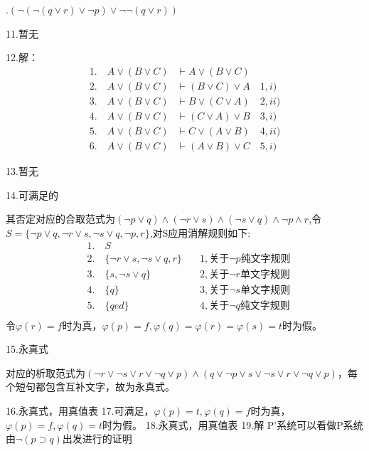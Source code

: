 \documentclass[a4paper]{ctexart}
\begin{document}
.$ \left( \neg \left( \neg \left( q\vee r\right)\vee \neg p \right)\vee \neg \neg \left( q\vee r\right) \right)$\newline

\noindent 11.暂无

\noindent 12.解：
\begin{align*}
    1.\quad A\vee (B\vee C)&\vdash A\vee (B\vee C) \\
    2.\quad A\vee (B\vee C)&\vdash (B\vee C)\vee A\quad 1, i) \\
    3.\quad A\vee (B\vee C)&\vdash B\vee (C\vee A)\quad 2, ii) \\
    4.\quad A\vee (B\vee C)&\vdash (C\vee A) \vee B\quad 3, i) \\
    5.\quad A\vee (B\vee C)&\vdash C\vee (A \vee B)\quad 4, ii) \\
    6.\quad A\vee (B\vee C)&\vdash (A\vee B) \vee C\quad 5, i)
\end{align*}

\noindent 13.暂无

\noindent 14.可满足的

其否定对应的合取范式为$(\neg p\vee q)\wedge(\neg r\vee s)\wedge(\neg s\vee q)\wedge \neg p \wedge r$,令$S=\{\neg p\vee q,\neg r\vee s,\neg s\vee q,\neg p,r\}$,对S应用消解规则如下:
\begin{align*}
    &1.\quad S &\\
    &2.\quad \{\neg r\vee s, \neg s\vee q, r\} \quad &1,\text{关于}\neg p\text{纯文字规则} \\
    &3.\quad \{s, \neg s\vee q\} \quad &2,\text{关于}\neg r\text{单文字规则}\\
    &4.\quad \{q\} \quad &3,\text{关于}\neg s\text{单文字规则}\\
    &5.\quad \{qed\} \quad &4,\text{关于}\neg q\text{纯文字规则}\\
\end{align*}
令$\varphi(r)=f$时为真，$\varphi(p)=f,\varphi(q)=\varphi(r)=\varphi(s)=t$时为假。\newline

\noindent 15.永真式

对应的析取范式为$(\neg r\vee \neg s\vee r\vee \neg q\vee p)\wedge (q\vee \neg p\vee s\vee \neg s\vee r\vee \neg q\vee p)$，每个短句都包含互补文字，故为永真式。\newline

\noindent 16.永真式，用真值表\newline
\noindent 17.可满足，$\varphi(p)=t, \varphi(q)=f$时为真，$\varphi(p)=f, \varphi(q)=t$时为假。\newline
\noindent 18.永真式，用真值表\newline
\noindent 19.解
P'系统可以看做P系统由$\neg(p\supset q)$出发进行的证明
\end{document}
